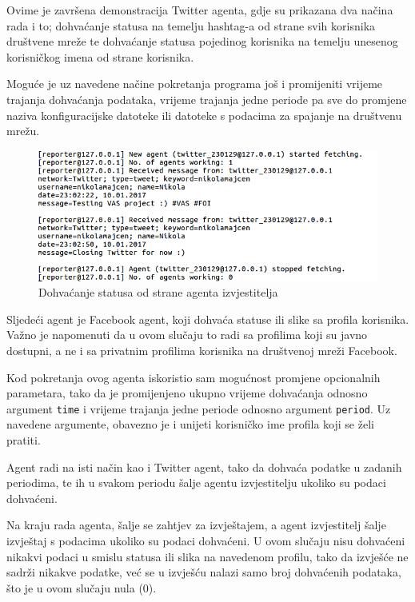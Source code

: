 \documentclass[a4paper,12pt]{foi}
\begin{document}
Ovime je završena demonstracija Twitter agenta, gdje su prikazana dva načina rada i to; dohvaćanje statusa na temelju hashtag-a od strane svih korisnika društvene mreže te dohvaćanje statusa pojedinog korisnika na temelju unesenog korisničkog imena od strane korisnika.

Moguće je uz navedene načine pokretanja programa još i promijeniti vrijeme trajanja dohvaćanja podataka, vrijeme trajanja jedne periode pa sve do promjene naziva konfiguracijske datoteke ili datoteke s podacima za spajanje na društvenu mrežu. 

\begin{figure}[h]
\includegraphics[width=\linewidth, frame]{07-reporter-getting-all-tweets-data}
	\caption{Dohvaćanje statusa od strane agenta izvjestitelja}
\end{figure}

Sljedeći agent je Facebook agent, koji dohvaća statuse ili slike sa profila korisnika. Važno je napomenuti da u ovom slučaju to radi sa profilima koji su javno dostupni, a ne i sa privatnim profilima korisnika na društvenoj mreži Facebook.

Kod pokretanja ovog agenta iskoristio sam mogućnost promjene opcionalnih parametara, tako da je promijenjeno ukupno vrijeme dohvaćanja odnosno argument \texttt{time} i vrijeme trajanja jedne periode odnosno argument \texttt{period}. Uz navedene argumente, obavezno je i unijeti korisničko ime profila koji se želi pratiti.

Agent radi na isti način kao i Twitter agent, tako da dohvaća podatke u zadanih periodima, te ih u svakom periodu šalje agentu izvjestitelju ukoliko su podaci dohvaćeni. 

Na kraju rada agenta, šalje se zahtjev za izvještajem, a agent izvjestitelj šalje izvještaj s podacima ukoliko su podaci dohvaćeni. U ovom slučaju nisu dohvaćeni nikakvi podaci u smislu statusa ili slika na navedenom profilu, tako da izvješće ne sadrži nikakve podatke, već se u izvješću nalazi samo broj dohvaćenih podataka, što je u ovom slučaju nula (0).
\end{document}
